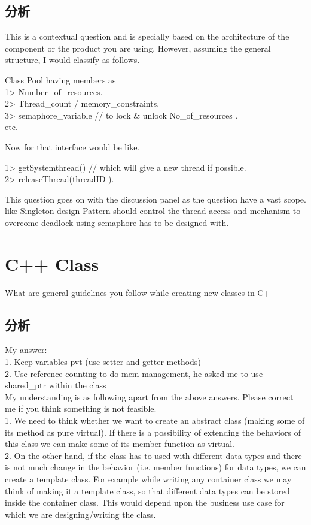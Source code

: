 \subsection{分析}
This is a contextual question and is specially based on the architecture of the component or the product you are using. However, assuming the general structure, I would classify
as follows.

Class Pool having members as \\
1> Number_of_resources. \\
2> Thread_count / memory_constraints. \\
3> semaphore_variable // to lock \& unlock No_of_resources . \\
etc.

Now for that interface would be like.

1> getSystemthread() // which will give a new thread if possible. \\
2> releaseThread(threadID ).


This question goes on with the discussion panel as the question have a vast scope. like Singleton design Pattern should control the thread access and mechanism to overcome
deadlock using semaphore has to be designed with.

\section{C++ Class}
What are general guidelines you follow while creating new classes in C++

\subsection{分析}
My answer: \\
1. Keep variables pvt (use setter and getter methods) \\
2. Use reference counting to do mem management, he asked me to use shared_ptr within the class\\

My understanding is as following apart from the above answers. Please correct me if you think something is not feasible. \\
1. We need to think whether we want to create an abstract class (making some of its method as pure virtual). If there is a possibility of extending the behaviors of this class we
can make some of its member function as virtual. \\
2. On the other hand, if the class has to used with different data types and there is not much change in the behavior (i.e. member functions) for data types, we can create a
template class. For example while writing any container class we may think of making it a template class, so that different data types can be stored inside the container class.
This would depend upon the business use case for which we are designing/writing the class.

